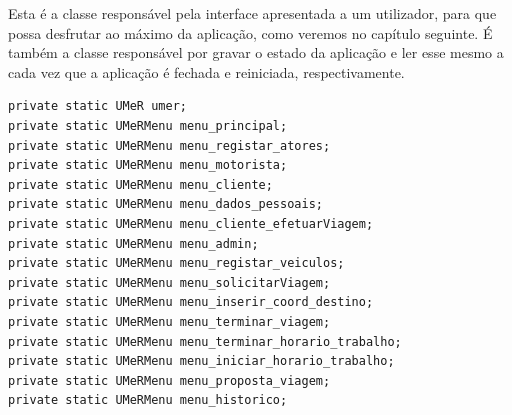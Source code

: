 Esta é a classe responsável pela interface apresentada a um utilizador, para que possa desfrutar ao máximo da aplicação, como veremos no capítulo seguinte. É também a classe responsável por gravar o estado da aplicação e ler esse mesmo a cada vez que a aplicação é fechada e reiniciada, respectivamente.

\begin{verbatim}
private static UMeR umer;
private static UMeRMenu menu_principal;
private static UMeRMenu menu_registar_atores;
private static UMeRMenu menu_motorista;
private static UMeRMenu menu_cliente;
private static UMeRMenu menu_dados_pessoais;
private static UMeRMenu menu_cliente_efetuarViagem;
private static UMeRMenu menu_admin;
private static UMeRMenu menu_registar_veiculos;
private static UMeRMenu menu_solicitarViagem; 
private static UMeRMenu menu_inserir_coord_destino;
private static UMeRMenu menu_terminar_viagem; 
private static UMeRMenu menu_terminar_horario_trabalho;
private static UMeRMenu menu_iniciar_horario_trabalho;
private static UMeRMenu menu_proposta_viagem;
private static UMeRMenu menu_historico;
\end{verbatim}




